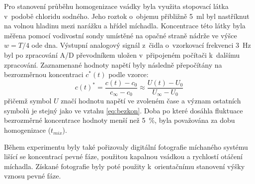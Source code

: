 Pro stanovení průběhu homogenizace vsádky byla využita stopovací látka v~podobě chloridu sodného. Jeho roztok o~objemu přibližně \SI{5}{\milli\litre} byl nastříknut na volnou hladinu mezi narážku a hřídel míchadla. Koncentrace této látky byla měřena pomocí vodivostní sondy umístěné na opačné straně nádrže ve výšce $w = T/4$ ode dna. Výstupní analogový signál z~čidla o~vzorkovací frekvenci \SI{3}{\hertz} byl po zpracování A/D převodníkem uložen v~připojeném počítači k~dalšímu zpracování. Zaznamenané hodnoty napětí byly následně přepočítány na bezrozměrnou koncentraci $c^{*}(t)$ podle vzorce:    
\begin{equation}
	c(t)^{*} = \frac{c(t) - c_{0}}{c_{\infty} - c_{0}} \approx \frac{U(t) - U_{0}}{U_{\infty} - U_{0}}
	\label{eq:bezkonU}
\end{equation}
přičemž symbol $U$ značí hodnotu napětí ve zvoleném čase a význam ostatních symbolů je stejný jako ve vztahu \ref{eq:bezkon}. Doba po které dosáhla fluktuace bezrozměrné koncentrace hodnoty menší než \SI{5}{\percent}, byla považována za dobu homogenizace ($t_{mix}$). 

Během experimentu byly také pořizovaly digitální fotografie míchaného systému lišící se koncentrací pevné fáze, použitou kapalnou vsádkou a rychlostí otáčení míchadla. Získané fotografie byly poté použity k~orientačnímu stanovení výšky vznosu pevné fáze. 
